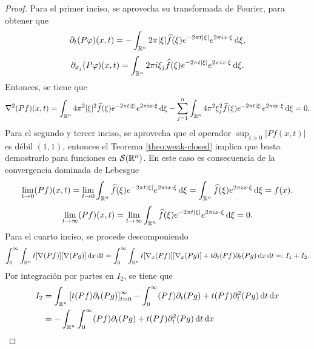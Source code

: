 \begin{proof}
	Para el primer inciso, se aprovecha su transformada de Fourier, para obtener que 
		\begin{equation*}
		\partial_t (P\varphi)(x, t) = - \int_{\mathbb{R}^n} 2\pi|\xi| \widehat{f}(\xi) e^{-2\pi t |\xi|} e^{2\pi ix \cdot \xi} \mathop{}\!\mathrm{d} \xi,
	\end{equation*}
	\begin{equation*}
		\partial_{x_j} (P\varphi)(x, t) = \int_{\mathbb{R}^n} 2\pi i\xi_j\widehat{f}(\xi) e^{-2\pi t |\xi|} e^{2\pi ix \cdot \xi} \mathop{}\!\mathrm{d} \xi.
	\end{equation*}
	Entonces, se tiene que 
	\begin{equation*}
		\nabla^2(Pf)(x, t) = \int_{\mathbb{R}^n} 4\pi^2|\xi|^2 \widehat{f}(\xi) e^{-2\pi t |\xi|} e^{2\pi ix \cdot \xi} \mathop{}\!\mathrm{d} \xi - \sum_{j=1}^n \int_{\mathbb{R}^n} 4\pi^2 \xi_j^2\widehat{f}(\xi) e^{-2\pi t |\xi|} e^{2\pi ix \cdot \xi} \mathop{}\!\mathrm{d} \xi = 0.
	\end{equation*}
	Para el segundo y tercer inciso, se aprovecha que el operador $\sup_{t>0}|Pf(x, t)|$ es débil $(1, 1)$, entonces el Teorema \ref{theo:weak-closed} implica que basta demostrarlo para funciones en $\mathcal{S}(\mathbb{R}^n)$. En este caso es consecuencia de la convergencia dominada de Lebesgue
	\begin{equation*}
		\lim_{t\to0} (Pf)(x, t) = \lim_{t\to0} \int_{\mathbb{R}^n} \widehat{f}(\xi) e^{-2\pi t |\xi|} e^{2\pi ix \cdot \xi} \mathop{}\!\mathrm{d} \xi = \int_{\mathbb{R}^n} \widehat{f}(\xi)  e^{2\pi ix \cdot \xi} \mathop{}\!\mathrm{d} \xi = f(x),
	\end{equation*}
	\begin{equation*}
		\lim_{t\to\infty} (Pf)(x, t) = \lim_{t\to\infty} \int_{\mathbb{R}^n} \widehat{f}(\xi) e^{-2\pi t |\xi|} e^{2\pi ix \cdot \xi} \mathop{}\!\mathrm{d} \xi =0.
	\end{equation*}
	Para el cuarto inciso, se procede descomponiendo
	\begin{equation*}
		 \int_0^\infty\int_{\mathbb{R}^n} t[\nabla(Pf)][\nabla(Pg)]\mathop{}\!\mathrm{d} x \mathop{}\!\mathrm{d} t = \int_0^\infty\int_{\mathbb{R}^n} t[\nabla_x(Pf)][\nabla_x(Pg)] + t\partial_t(Pf)\partial_t(Pg)\mathop{}\!\mathrm{d} x \mathop{}\!\mathrm{d} t =: I_1+I_2.
	\end{equation*}
	Por integración por partes en $I_2$, se tiene que
	\begin{align*}
		I_2& = \int_{\R^n} \left[ t(Pf)\partial_t(Pg) 
		\right]_{t=0}^\infty - \int_0^\infty (Pf)\partial_t(Pg) + t(Pf)\partial^2_t(Pg)\diff t \diff x \\  
		& =- \int_{\R^n}  \int_0^\infty (Pf)\partial_t(Pg) + t(Pf)\partial^2_t(Pg)\diff t \diff x\\

\end{align*}
\end{proof}
